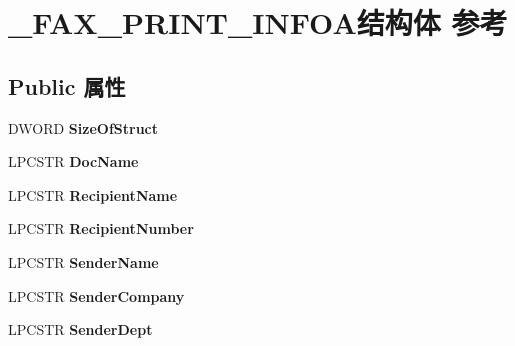 \hypertarget{struct___f_a_x___p_r_i_n_t___i_n_f_o_a}{}\section{\+\_\+\+F\+A\+X\+\_\+\+P\+R\+I\+N\+T\+\_\+\+I\+N\+F\+O\+A结构体 参考}
\label{struct___f_a_x___p_r_i_n_t___i_n_f_o_a}
\subsection*{Public 属性}
\begin{DoxyCompactItemize}
\item 
\mbox{\label{struct___f_a_x___p_r_i_n_t___i_n_f_o_a_a1a0fc07f400253d32123f36107f4892c}} 
D\+W\+O\+RD {\bfseries Size\+Of\+Struct}
\item 
\mbox{\label{struct___f_a_x___p_r_i_n_t___i_n_f_o_a_ae78a7e803bfa04f9ad5c9f3240122add}} 
L\+P\+C\+S\+TR {\bfseries Doc\+Name}
\item 
\mbox{\label{struct___f_a_x___p_r_i_n_t___i_n_f_o_a_af4e1a18ac2cb9871a0a2c4e5008317a9}} 
L\+P\+C\+S\+TR {\bfseries Recipient\+Name}
\item 
\mbox{\label{struct___f_a_x___p_r_i_n_t___i_n_f_o_a_a74da08bf8e8afb049369b80ede620084}} 
L\+P\+C\+S\+TR {\bfseries Recipient\+Number}
\item 
\mbox{\label{struct___f_a_x___p_r_i_n_t___i_n_f_o_a_afd278a3ecb15b4a1aeabd7bbd3f75722}} 
L\+P\+C\+S\+TR {\bfseries Sender\+Name}
\item 
\mbox{\label{struct___f_a_x___p_r_i_n_t___i_n_f_o_a_afa45d7391e5ff449b1d4a7bac738b4b9}} 
L\+P\+C\+S\+TR {\bfseries Sender\+Company}
\item 
\mbox{\label{struct___f_a_x___p_r_i_n_t___i_n_f_o_a_a40cb69d3a98bc0ec6814f4540451764f}} 
L\+P\+C\+S\+TR {\bfseries Sender\+Dept}
\item 

\end{DoxyCompactItemize}
